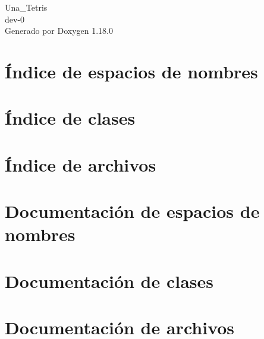 \documentclass[twoside]{book}
\newcommand{\+}{\discretionary{\mbox{\scriptsize$\hookleftarrow$}}{}{}}
\newcommand{\clearemptydoublepage}{%
    \newpage{\pagestyle{empty}\cleardoublepage}%
  }
\begin{document}
  \raggedbottom
    \hypersetup{pageanchor=false,
                bookmarksnumbered=true,
                pdfencoding=unicode
               }
  \begin{titlepage}
  \vspace*{7cm}
  \begin{center}%
  {\Large Una\+\_\+\+Tetris}\\
  [1ex]\large dev-\/0 \\
  \vspace*{1cm}
  {\large Generado por Doxygen 1.18.0}\\
  \end{center}
  \end{titlepage}
  \clearemptydoublepage
  \tableofcontents
  \clearemptydoublepage
  \hypersetup{pageanchor=true}
\chapter{Índice de espacios de nombres}

\chapter{Índice de clases}

\chapter{Índice de archivos}

\chapter{Documentación de espacios de nombres}

\chapter{Documentación de clases}












\chapter{Documentación de archivos}














  \backmatter
  \newpage
  \clearemptydoublepage
  \printindex
\end{document}
